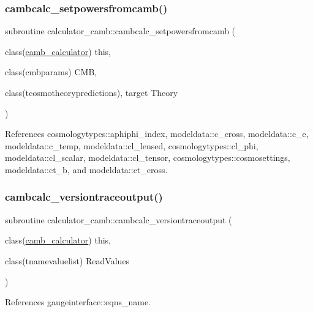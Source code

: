 \subsubsection{\texorpdfstring{cambcalc\+\_\+setpowersfromcamb()}{cambcalc\_setpowersfromcamb()}}
{\footnotesize\ttfamily subroutine calculator\+\_\+camb\+::cambcalc\+\_\+setpowersfromcamb (\begin{DoxyParamCaption}\item[{class(\mbox{\hyperlink{structcalculator__camb_1_1camb__calculator}{camb\+\_\+calculator}})}]{this,  }\item[{class(cmbparams)}]{C\+MB,  }\item[{class(tcosmotheorypredictions), target}]{Theory }\end{DoxyParamCaption})}



References cosmologytypes\+::aphiphi\+\_\+index, modeldata\+::c\+\_\+cross, modeldata\+::c\+\_\+e, modeldata\+::c\+\_\+temp, modeldata\+::cl\+\_\+lensed, cosmologytypes\+::cl\+\_\+phi, modeldata\+::cl\+\_\+scalar, modeldata\+::cl\+\_\+tensor, cosmologytypes\+::cosmosettings, modeldata\+::ct\+\_\+b, and modeldata\+::ct\+\_\+cross.

\mbox{\label{namespacecalculator__camb_a67d98d7cdaa015cca41f95ed94678a79}} 
\subsubsection{\texorpdfstring{cambcalc\+\_\+versiontraceoutput()}{cambcalc\_versiontraceoutput()}}
{\footnotesize\ttfamily subroutine calculator\+\_\+camb\+::cambcalc\+\_\+versiontraceoutput (\begin{DoxyParamCaption}\item[{class(\mbox{\hyperlink{structcalculator__camb_1_1camb__calculator}{camb\+\_\+calculator}})}]{this,  }\item[{class(tnamevaluelist)}]{Read\+Values }\end{DoxyParamCaption})\hspace{0.3cm}{\ttfamily [private]}}



References gaugeinterface\+::eqns\+\_\+name.

